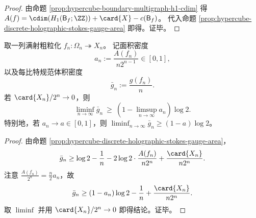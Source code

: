 \begin{proof}
由命题 \ref{prop:hypercube-boundary-multigraph-h1-cdim} 得
\(
A(f)=\cdim(H_1(\mathsf B_f;\ZZ))+\card{X}-c(\mathsf B_f)
\)。
代入命题 \ref{prop:hypercube-discrete-holographic-stokes-gauge-area} 即得。证毕。
\end{proof}

\begin{corollary}[面积密度极限下的线性面积律]\label{cor:hypercube-linear-area-law-density}
取一列满射粗粒化 \(f_n:\Omega_n\twoheadrightarrow X_n\)。
记面积密度
\[
a_n:=\frac{A(f_n)}{n2^{n-1}}\in[0,1],
\]
以及每比特规范体积密度
\[
\bar g_n:=\frac{g(f_n)}{n}.
\]
若 \(\card{X_n}/2^n\to 0\)，则
\[
\boxed{\;
\liminf_{n\to\infty}\bar g_n\ \ge\ (1-\limsup_{n\to\infty}a_n)\log 2.
\;}
\]
特别地，若 \(a_n\to a\in[0,1]\)，则 \(\liminf_{n\to\infty}\bar g_n\ge (1-a)\log 2\)。
\end{corollary}

\begin{proof}
由命题 \ref{prop:hypercube-discrete-holographic-stokes-gauge-area}，
\[
\bar g_n
\ge
\log 2-\frac{1}{n}-2\log 2\cdot\frac{A(f_n)}{n2^n}+\frac{\card{X_n}}{n2^n}.
\]
注意 \(\frac{A(f_n)}{2^n}=\frac{n}{2}a_n\)，故
\[
\bar g_n\ge (1-a_n)\log 2-\frac{1}{n}+\frac{\card{X_n}}{n2^n}.
\]
取 \(\liminf\) 并用 \(\card{X_n}/2^n\to 0\) 即得结论。证毕。
\end{proof}














\endinput
